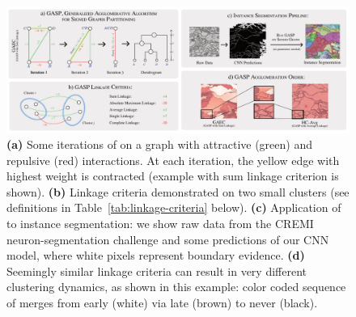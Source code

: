 \begin{figure}[t]
\centering
\includegraphics[width=\textwidth]{figures/GASP/intro_image_v6.pdf} %
\caption{\textbf{(a)} Some iterations of \algname{} on a graph with attractive (green) and repulsive (red) interactions. At each iteration, the yellow edge with highest weight is contracted (example with sum linkage criterion is shown). \textbf{(b)} Linkage criteria demonstrated on two small clusters (see definitions in Table~\ref{tab:linkage-criteria} below).  \textbf{(c)} Application of \algname{} to instance segmentation: we show raw data from the CREMI neuron-segmentation challenge and some predictions of our CNN model, where white pixels represent boundary evidence. \textbf{(d)} 
Seemingly similar linkage criteria can result in very different clustering dynamics, as shown in this example: color coded sequence of merges from early (white) via late (brown) to never (black).
\label{fig:intro_figure}}
\end{figure}


